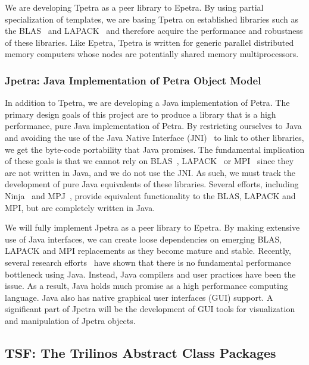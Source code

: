 \documentclass[acmtoms,acmnow]{acmtrans2m}
\begin{document}
We are developing Tpetra as a peer library to Epetra. By using partial
specialization of templates, we are basing Tpetra on established libraries 
such as the BLAS~\cite{BLAS1,BLAS2,BLAS3} and LAPACK~\cite{lapack} and 
therefore acquire the performance and robustness of these libraries.
Like Epetra, Tpetra is written for generic parallel distributed
memory computers whose nodes are
potentially shared memory multiprocessors.

\subsubsection{Jpetra: Java Implementation of Petra Object Model}

In addition to Tpetra, we are developing a Java implementation of Petra.  
The primary design goals of this project are to produce a library that 
is a high performance, pure Java implementation of Petra.  By restricting 
ourselves to Java and avoiding the use of the Java Native Interface 
(JNI)~\cite{JNI-site} to link to other libraries, we get the byte-code 
portability that Java promises.  The fundamental implication of these 
goals is that we cannot rely on BLAS~\cite{BLAS1,BLAS2,BLAS3}, 
LAPACK~\cite{lapack} or MPI~\cite{MPI} since they are not written in 
Java, and we do not use the JNI.  As such, we must track the development 
of pure Java equivalents of these libraries.  Several efforts, including 
Ninja~\cite{MoreMidkGuptArtiWuAlma2001} and 
MPJ~\cite{CarpGetoJuddSkjeFox2000}, provide equivalent functionality 
to the BLAS, LAPACK and MPI, but are completely written in Java.

We will fully implement Jpetra as a peer library to Epetra.  By making 
extensive use of Java interfaces, we can create loose dependencies on 
emerging BLAS, LAPACK and MPI replacements as they become mature and 
stable.  Recently, several research 
efforts~\cite{MoreMidkGuptArtiWuAlma2001,SCIMARK-site} have shown 
that there is no fundamental performance bottleneck using Java.  
Instead, Java compilers and user practices have been the issue.  
As a result, Java holds much promise as a high performance computing 
language.  Java also has native graphical user 
interfaces (GUI) support.  A significant part of Jpetra will be 
the development of GUI tools for visualization and manipulation of 
Jpetra objects.


\subsection{TSF: The Trilinos Abstract Class Packages}
\end{document}
